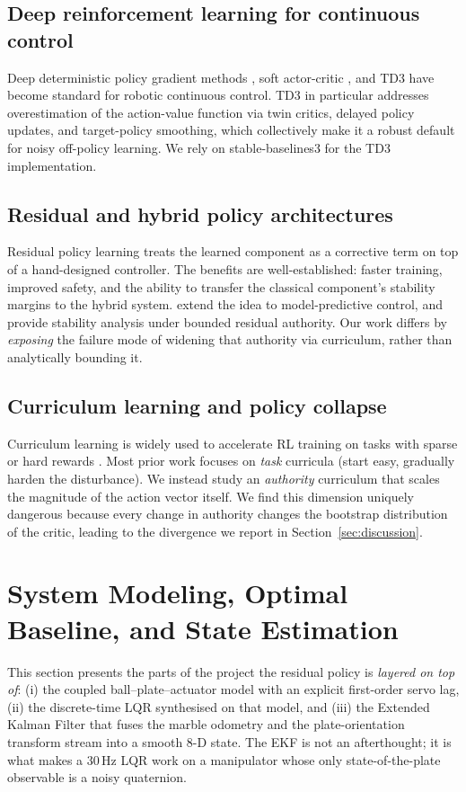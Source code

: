 \documentclass[conference]{IEEEtran}
\begin{document}
\subsection{Deep reinforcement learning for continuous control}
Deep deterministic policy gradient methods \cite{Lillicrap2016}, soft
actor-critic \cite{Haarnoja2018}, and TD3 \cite{Fujimoto2018} have become
standard for robotic continuous control. TD3 in particular addresses
overestimation of the action-value function via twin critics, delayed policy
updates, and target-policy smoothing, which collectively make it a robust
default for noisy off-policy learning. We rely on stable-baselines3
\cite{Raffin2021} for the TD3 implementation.

\subsection{Residual and hybrid policy architectures}
Residual policy learning \cite{Silver2018,Johannink2019} treats the learned
component as a corrective term on top of a hand-designed controller. The
benefits are well-established: faster training, improved safety, and the
ability to transfer the classical component's stability margins to the hybrid
system. \cite{Iwata2021} extend the idea to model-predictive control, and
\cite{Westenbroek2022} provide stability analysis under bounded residual
authority. Our work differs by \emph{exposing} the failure mode of widening
that authority via curriculum, rather than analytically bounding it.

\subsection{Curriculum learning and policy collapse}
Curriculum learning \cite{Bengio2009} is widely used to accelerate
RL training on tasks with sparse or hard rewards
\cite{Akkaya2019,Florensa2017}. Most prior work focuses on \emph{task}
curricula (start easy, gradually harden the disturbance). We instead study an
\emph{authority} curriculum that scales the magnitude of the action vector
itself. We find this dimension uniquely dangerous because every change in
authority changes the bootstrap distribution of the critic, leading to the
divergence we report in Section~\ref{sec:discussion}.

\section{System Modeling, Optimal Baseline, and State Estimation}
\label{sec:model}
This section presents the parts of the project the residual policy is
\emph{layered on top of}: (i) the coupled ball--plate--actuator model with an
explicit first-order servo lag, (ii) the discrete-time LQR synthesised on
that model, and (iii) the Extended Kalman Filter that fuses the marble
odometry and the plate-orientation transform stream into a smooth 8-D state. The
EKF is not an afterthought; it is what makes a $30\,$Hz LQR work on a
manipulator whose only state-of-the-plate observable is a noisy quaternion.
\end{document}
